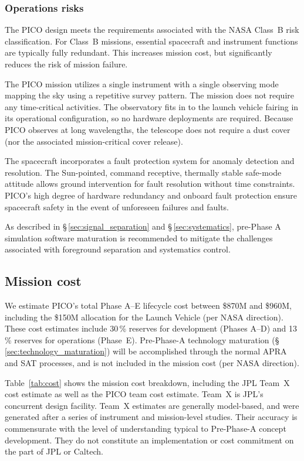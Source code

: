 \subsubsection{Operations risks}
\label{sec:operations_risks} %

The PICO design meets the requirements associated with the NASA
Class~B risk classification. For Class~B missions, essential
spacecraft and instrument functions are typically fully
redundant. This increases mission cost, but significantly reduces the
risk of mission failure.

The PICO mission utilizes a single instrument with a single observing
mode mapping the sky using a repetitive survey pattern. The mission
does not require any time-critical activities. The observatory fits in
to the launch vehicle fairing in its operational configuration, so no
hardware deployments are required. Because PICO observes at long
wavelengths, the telescope does not require a dust cover (nor the
associated mission-critical cover release).

The spacecraft incorporates a fault protection system for anomaly
detection and resolution. The Sun-pointed, command receptive,
thermally stable safe-mode attitude allows ground intervention for
fault resolution without time constraints. PICO's high degree of
hardware redundancy and onboard fault protection ensure spacecraft
safety in the event of unforeseen failures and faults.

As described in \S\,\ref{sec:signal_separation} and
\S\,\ref{sec:systematics}, pre-Phase A simulation software maturation
is recommended to mitigate the challenges associated with foreground
separation and systematics control.

\subsection{Mission cost}
\label{sec:mission_cost} %

We estimate PICO's total Phase A--E lifecycle cost between \$870M and
\$960M, including the \$150M allocation for the Launch Vehicle (per
NASA direction). These cost estimates include 30\,\% reserves for
development (Phases A--D) and 13\,\% reserves for operations
(Phase~E). Pre-Phase-A technology maturation
(\S\,\ref{sec:technology_maturation}) will be accomplished through the
normal APRA and SAT processes, and is not included in the mission cost
(per NASA direction).

Table~\ref{tab:cost} shows the mission cost breakdown, including the
JPL Team~X cost estimate as well as the PICO team cost estimate. Team~X
 is JPL's concurrent design facility. Team~X estimates are generally
model-based, and were generated after a series of instrument and
mission-level studies. Their accuracy is commensurate with the level
of understanding typical to Pre-Phase-A concept development. They do
not constitute an implementation or cost commitment on the part of JPL
or Caltech.

